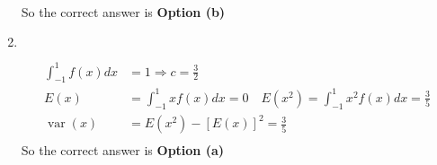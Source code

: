 \begin{enumerate}
\begin{answer}
\begin{align*}
		\end{align*}
		So the correct answer is \textbf{Option (b)}
	\end{answer}
	\item $\left. \right. $
	\begin{answer}
		\begin{align*}
		\int_{-1}^{1} f(x) d x&=1 \Rightarrow c=\frac{3}{2}\\
		E(x)&=\int_{-1}^{1} x f(x) d x=0 \quad E\left(x^{2}\right)=\int_{-1}^{1} x^{2} f(x) d x=\frac{3}{5}\\
		\operatorname{var}(x)&=E\left(x^{2}\right)-[E(x)]^{2}=\frac{3}{5}\\
		\end{align*}
		So the correct answer is \textbf{Option (a)}
	\end{answer}
	
	
	
	
	
	
	
	
	
	
	
	
	
	
	
	
	
	
	
	
	
	
	
	
	
	
	
	
\end{enumerate}